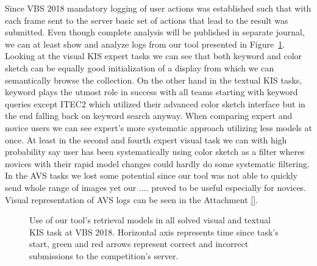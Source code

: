 Since VBS 2018 mandatory logging of user actions was established such that with each frame sent to the server basic set of actions that lead to the result was submitted. Even though complete analysis will be published in separate journal, we can at least show and analyze logs from our tool presented in Figure~\ref{fig:vbs_tasks_timeline}. Looking at the visual KIS expert tasks we can see that both keyword and color sketch can be equally good initialization of a display from which we can semantically browse the collection. On the other hand in the textual KIS tasks, keyword plays the utmost role in success with all teams starting with keyword queries except ITEC2 which utilized their advanced color sketch interface but in the end falling back on keyword search anyway. When comparing expert and novice users we can see expert's more systematic approach utilizing less models at once. At least in the second and fourth expert visual task we can with high probability say user has been systematically using color sketch as a filter wheres novices with their rapid model changes could hardly do some systematic filtering. In the AVS tasks we lost some potential since our tool was not able to quickly send whole range of images yet our .... proved to be useful especially for novices. Visual representation of AVS logs can be seen in the Attachment \ref{}.

\begin{figure}
	\centering
	
	
	\caption[Use of tool's retrieval models in KIS tasks]{Use of our tool's retrieval models in all solved visual and textual KIS task at VBS 2018. Horizontal axis represents time since task's start, green and red arrows represent correct and incorrect submissions to the competition's server.}
	\label{fig:vbs_tasks_timeline}
\end{figure}
